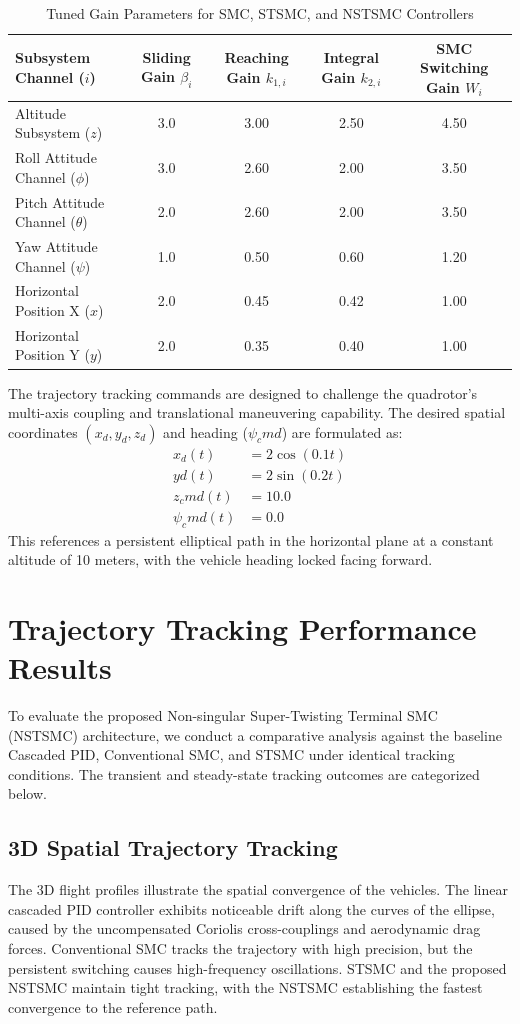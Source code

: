 \begin{table}[h!]
\centering
\caption{Tuned Gain Parameters for SMC, STSMC, and NSTSMC Controllers}
\label{tab:controller_gains}
\begin{tabular}{|l|c|c|c|c|}
\hline
\textbf{Subsystem Channel ($i$)} & \textbf{Sliding Gain $\beta_i$} & \textbf{Reaching Gain $k_{1,i}$} & \textbf{Integral Gain $k_{2,i}$} & \textbf{SMC Switching Gain $W_i$} \\
\hline
Altitude Subsystem ($z$) & 3.0 & 3.00 & 2.50 & 4.50 \\
Roll Attitude Channel ($\phi$) & 3.0 & 2.60 & 2.00 & 3.50 \\
Pitch Attitude Channel ($\theta$) & 2.0 & 2.60 & 2.00 & 3.50 \\
Yaw Attitude Channel ($\psi$) & 1.0 & 0.50 & 0.60 & 1.20 \\
Horizontal Position X ($x$) & 2.0 & 0.45 & 0.42 & 1.00 \\
Horizontal Position Y ($y$) & 2.0 & 0.35 & 0.40 & 1.00 \\
\hline
\end{tabular}
\end{table}

The trajectory tracking commands are designed to challenge the quadrotor's multi-axis coupling and translational maneuvering capability. The desired spatial coordinates $(x_d, y_d, z_d)$ and heading ($\psi_cmd$) are formulated as:
\begin{align}
x_d(t) &= 2\cos(0.1t) \\
yd(t) &= 2\sin(0.2t) \\
z_cmd(t) &= 10.0 \\
\psi_cmd(t) &= 0.0
\end{align}
This references a persistent elliptical path in the horizontal plane at a constant altitude of 10 meters, with the vehicle heading locked facing forward.

\section{Trajectory Tracking Performance Results}
To evaluate the proposed Non-singular Super-Twisting Terminal SMC (NSTSMC) architecture, we conduct a comparative analysis against the baseline Cascaded PID, Conventional SMC, and STSMC under identical tracking conditions. The transient and steady-state tracking outcomes are categorized below.

\subsection{3D Spatial Trajectory Tracking}
The 3D flight profiles illustrate the spatial convergence of the vehicles. The linear cascaded PID controller exhibits noticeable drift along the curves of the ellipse, caused by the uncompensated Coriolis cross-couplings and aerodynamic drag forces. Conventional SMC tracks the trajectory with high precision, but the persistent switching causes high-frequency oscillations. STSMC and the proposed NSTSMC maintain tight tracking, with the NSTSMC establishing the fastest convergence to the reference path.

